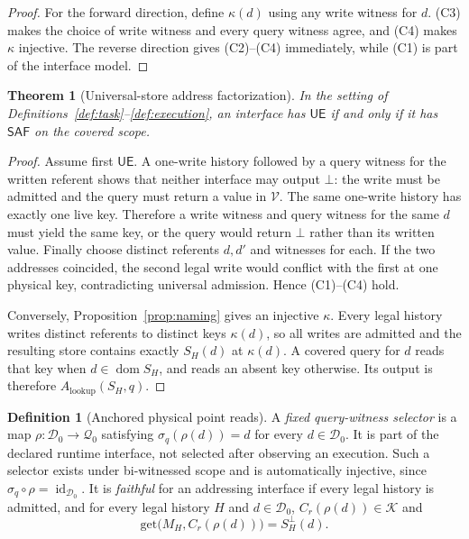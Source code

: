 \documentclass[11pt]{article}
\theoremstyle{definition}
\newtheorem{definition}{Definition}
\theoremstyle{plain}
\newtheorem{theorem}{Theorem}
\newcommand{\Dom}{\mathcal{D}}
\newcommand{\Qu}{\mathcal{Q}}
\newcommand{\Ky}{\mathcal{K}}
\newcommand{\Va}{\mathcal{V}}
\newcommand{\bt}{\bot}
\newcommand{\semq}{\sigma_q}
\newcommand{\SAF}{\mathsf{SAF}}
\newcommand{\UE}{\mathsf{UE}}
\newcommand{\Alkup}{A_{\mathrm{lookup}}}
\begin{document}
\begin{proof}
For the forward direction, define \(\kappa(d)\) using any write witness for
\(d\).  (C3) makes the choice of write witness and every query witness agree,
and (C4) makes \(\kappa\) injective.  The reverse direction gives (C2)--(C4)
immediately, while (C1) is part of the interface model.
\end{proof}

\begin{theorem}[Universal-store address factorization]\label{thm:factor}
In the setting of Definitions~\ref{def:task}--\ref{def:execution}, an
interface has \(\UE\) if and only if it has \(\SAF\) on the covered scope.
\end{theorem}

\begin{proof}
Assume first \(\UE\).  A one-write history followed by a query witness for
the written referent shows that neither interface may output \(\bt\): the
write must be admitted and the query must return a value in \(\Va\).  The
same one-write history has exactly one live key.  Therefore a write witness
and query witness for the same \(d\) must yield the same key, or the query
would return \(\bt\) rather than its written value.  Finally choose distinct
referents \(d,d'\) and witnesses for each.  If the two addresses coincided,
the second legal write would conflict with the first at one physical key,
contradicting universal admission.  Hence (C1)--(C4)
hold.

Conversely, Proposition~\ref{prop:naming} gives an injective \(\kappa\).
Every legal history writes distinct referents to distinct keys
\(\kappa(d)\), so all writes are admitted and the resulting store contains
exactly \(S_H(d)\) at \(\kappa(d)\).  A covered query for \(d\) reads that key
when \(d\in\operatorname{dom}S_H\), and reads an absent key otherwise.  Its
output is therefore \(\Alkup(S_H,q)\).
\end{proof}

\begin{definition}[Anchored physical point reads]\label{def:anchor}
A \emph{fixed query-witness selector} is a map
\(\rho:\Dom_0\to\Qu_0\) satisfying
\(\semq(\rho(d))=d\) for every \(d\in\Dom_0\).  It is part of the
declared runtime interface, not selected after observing an execution.  Such
a selector exists under bi-witnessed scope and is automatically injective,
since \(\semq\circ\rho=\operatorname{id}_{\Dom_0}\).  It is \emph{faithful} for an
addressing interface if every legal history is admitted, and for every legal
history \(H\) and \(d\in\Dom_0\), \(C_r(\rho(d))\in\Ky\) and
\[
 \mathrm{get}\bigl(M_H,C_r(\rho(d))\bigr)=S_H^{\bt}(d). \tag{F}
\]
\end{definition}
\end{document}

